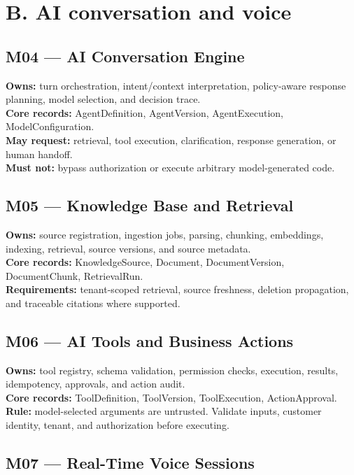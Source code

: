 \section{B. AI conversation and voice}

\subsection{M04 --- AI Conversation Engine}

\textbf{Owns:} turn orchestration, intent/context interpretation, policy-aware response planning, model selection, and decision trace. \\ \textbf{Core records:} AgentDefinition, AgentVersion, AgentExecution, ModelConfiguration. \\ \textbf{May request:} retrieval, tool execution, clarification, response generation, or human handoff. \\ \textbf{Must not:} bypass authorization or execute arbitrary model-generated code.

\subsection{M05 --- Knowledge Base and Retrieval}

\textbf{Owns:} source registration, ingestion jobs, parsing, chunking, embeddings, indexing, retrieval, source versions, and source metadata. \\ \textbf{Core records:} KnowledgeSource, Document, DocumentVersion, DocumentChunk, RetrievalRun. \\ \textbf{Requirements:} tenant-scoped retrieval, source freshness, deletion propagation, and traceable citations where supported.

\subsection{M06 --- AI Tools and Business Actions}

\textbf{Owns:} tool registry, schema validation, permission checks, execution, results, idempotency, approvals, and action audit. \\ \textbf{Core records:} ToolDefinition, ToolVersion, ToolExecution, ActionApproval. \\ \textbf{Rule:} model-selected arguments are untrusted. Validate inputs, customer identity, tenant, and authorization before executing.

\subsection{M07 --- Real-Time Voice Sessions}

